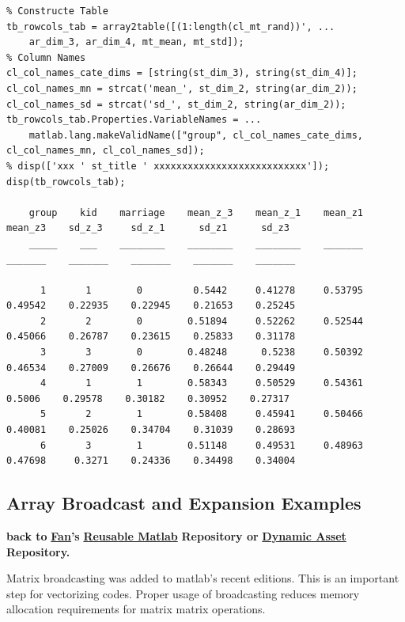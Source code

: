 \documentclass[
]{book}
\begin{document}
\begin{verbatim}
% Constructe Table
tb_rowcols_tab = array2table([(1:length(cl_mt_rand))', ...
    ar_dim_3, ar_dim_4, mt_mean, mt_std]);
% Column Names
cl_col_names_cate_dims = [string(st_dim_3), string(st_dim_4)];
cl_col_names_mn = strcat('mean_', st_dim_2, string(ar_dim_2));
cl_col_names_sd = strcat('sd_', st_dim_2, string(ar_dim_2));
tb_rowcols_tab.Properties.VariableNames = ...
    matlab.lang.makeValidName(["group", cl_col_names_cate_dims, cl_col_names_mn, cl_col_names_sd]);
% disp(['xxx ' st_title ' xxxxxxxxxxxxxxxxxxxxxxxxxxx']);
disp(tb_rowcols_tab);

    group    kid    marriage    mean_z_3    mean_z_1    mean_z1    mean_z3    sd_z_3     sd_z_1      sd_z1      sd_z3 
    _____    ___    ________    ________    ________    _______    _______    _______    _______    _______    _______

      1       1        0         0.5442     0.41278     0.53795    0.49542    0.22935    0.22945    0.21653    0.25245
      2       2        0        0.51894     0.52262     0.52544    0.45066    0.26787    0.23615    0.25833    0.31178
      3       3        0        0.48248      0.5238     0.50392    0.46534    0.27009    0.26676    0.26644    0.29449
      4       1        1        0.58343     0.50529     0.54361     0.5006    0.29578    0.30182    0.30952    0.27317
      5       2        1        0.58408     0.45941     0.50466    0.40081    0.25026    0.34704    0.31039    0.28693
      6       3        1        0.51148     0.49531     0.48963    0.47698     0.3271    0.24336    0.34498    0.34004
\end{verbatim}

\hypertarget{array-broadcast-and-expansion-examples}{%
\subsection{Array Broadcast and Expansion Examples}\label{array-broadcast-and-expansion-examples}}

\textbf{back to} \href{https://fanwangecon.github.io}{\textbf{Fan}}\textbf{'s} \href{https://fanwangecon.github.io/M4Econ/}{\textbf{Reusable
Matlab}} \textbf{Repository or}
\href{https://fanwangecon.github.io/CodeDynaAsset/}{\textbf{Dynamic Asset}}
\textbf{Repository.}

Matrix broadcasting was added to matlab's recent editions. This is an
important step for vectorizing codes. Proper usage of broadcasting
reduces memory allocation requirements for matrix matrix operations.
\end{document}
